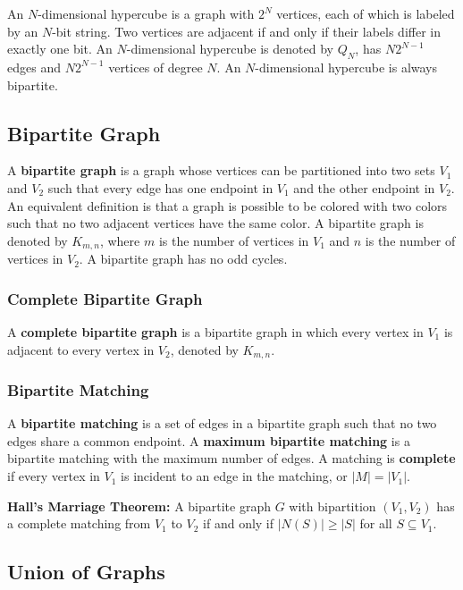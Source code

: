\documentclass[a4paper,12pt]{article}
\begin{document}
An $N$-dimensional hypercube is a graph with $2^N$ vertices, each of which is labeled by an $N$-bit string.
Two vertices are adjacent if and only if their labels differ in exactly one bit.
An $N$-dimensional hypercube is denoted by $Q_N$, has $N2^{N-1}$ edges and $N2^{N-1}$ vertices of degree $N$.
An $N$-dimensional hypercube is always bipartite.

\subsection{Bipartite Graph}

A \textbf{bipartite graph} is a graph whose vertices can be partitioned into two sets $V_1$ and $V_2$ such that every edge has one endpoint in $V_1$ and the other endpoint in $V_2$.
An equivalent definition is that a graph is possible to be colored with two colors such that no two adjacent vertices have the same color.
A bipartite graph is denoted by $K_{m,n}$, where $m$ is the number of vertices in $V_1$ and $n$ is the number of vertices in $V_2$.
A bipartite graph has no odd cycles.

\subsubsection{Complete Bipartite Graph}

A \textbf{complete bipartite graph} is a bipartite graph in which every vertex in $V_1$ is adjacent to every vertex in $V_2$, denoted by $K_{m,n}$.

\subsubsection{Bipartite Matching}

A \textbf{bipartite matching} is a set of edges in a bipartite graph such that no two edges share a common endpoint.
A \textbf{maximum bipartite matching} is a bipartite matching with the maximum number of edges.
A matching is \textbf{complete} if every vertex in $V_1$ is incident to an edge in the matching, or $|M| = |V_1|$.

\textbf{Hall's Marriage Theorem:}
A bipartite graph $G$ with bipartition $(V_1, V_2)$ has a complete matching from $V_1$ to $V_2$ if and only if $|N(S)| \geq |S|$ for all $S \subseteq V_1$.

\subsection{Union of Graphs}
\end{document}
